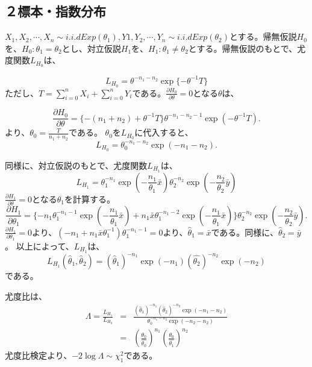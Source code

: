 \documentclass[a4paper,11pt,dvipdfmx]{jsarticle}
\begin{document}
\subsection{２標本・指数分布}
$X_1,X_2,\cdots,X_n \sim i.i.d Exp(\theta_1),Y1,Y_2,\cdots,Y_n \sim i.i.d Exp(\theta_2)$とする。帰無仮説$H_0$を、$H_0:\theta_1=\theta_2$とし、対立仮説$H_1$を、$H_1 : \theta_1 \neq \theta_2$とする。帰無仮説のもとで、尤度関数$L_{H_0}$は、

\begin{equation}
    L_{H_0} = \theta^{-n_1-n_2}\exp\{-\theta^{-1}T\}
\end{equation}
ただし、$T=\sum_{i=0}^n X_i+\sum_{i=0}^n Y_i$である。$\frac{\partial H_0}{\partial\theta}=0$となる$\theta$は、

\begin{equation}
    \frac{\partial H_0}{\partial\theta} = \{ -(n_1+n_2)+\theta^{-1}T \}\theta^{-n_1-n_2-1}\exp(-\theta^{-1}T).
\end{equation}
より、$\theta_0=\frac{T}{n_1+n_2}$である。
$\theta_0$を$L_{H_0}$に代入すると、
\begin{equation}
    L_{H_0} = \theta_0^{-n_1-n_2}\exp(-n_1-n_2).
\end{equation}

同様に、対立仮説のもとで、尤度関数$L_{H_1}$は、
\begin{equation}
    L_{H_1} = \theta_1^{-n_1}\exp(-\frac{n_1}{\theta_1}\bar{x})\theta_2^{-n_2}\exp(-\frac{n_2}{\theta_2}\bar{y})
\end{equation}
$\frac{\partial H_1}{\partial\theta}=0$となる$\theta_1$を計算する。
\begin{equation}
    \frac{\partial H_1}{\partial\theta_1}=\{ -n_1\theta_1^{-n_1-1} \exp(-\frac{n_1}{\theta_1}\bar{x})+n_1\bar{x}\theta_1^{-n_1-2}\exp(-\frac{n_1}{\theta_1}\bar{x})\}\theta_2^{-n_2}\exp(-\frac{n_2}{\theta_2}\bar{y}).
\end{equation}
$ \frac{\partial H_1}{\partial\theta_1}=0$より、$(-n_1+n_1\bar{x}\theta_1^{-1})\theta_1^{-n_1-1}=0$より、$\hat{\theta}_1=\bar{x}$である。同様に、$\hat{\theta}_2=\bar{y}$。
以上によって、$L_{H_1}$は、
\begin{equation}
    L_{H_1}(\hat{\theta}_1,\hat{\theta}_2) = (\hat{\theta}_1)^{-n_1}\exp(-n_1)(\hat{\theta_2})^{-n_2}\exp(-n_2)
\end{equation}
である。

尤度比は、
\begin{eqnarray}
    \varLambda = \frac{L_{H_1}}{L_{H_0}} &=& \frac{ (\hat{\theta}_1)^{-n_1}(\hat{\theta}_2)^{-n_2} \exp(-n_1-n_2)}{ \theta_0^{-n_1-n_2}\exp(-n_2-n_2) }\\
    &=& \left(\frac{\theta_0}{\hat{\theta_0}}\right)^{n_1} \left(\frac{\theta_0}{\hat{\theta_1}} \right)^{n_2}
\end{eqnarray}
尤度比検定より、$-2\log \varLambda \sim\chi^2_1$である。
\end{document}

